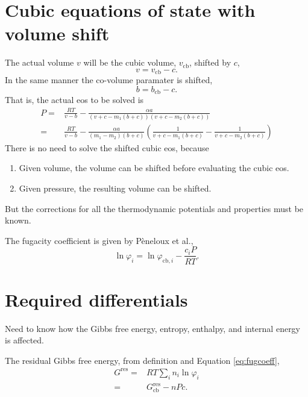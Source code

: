 \documentclass[english]{article}
\newcommand{\cubic}{\text{cb}}
\newcommand{\resid}{\text{res}}
\begin{document}
\section{Cubic equations of state with volume shift}
The actual volume $v$ will be the cubic volume, $v_\cubic$, shifted by $c$,
\begin{equation}
  v = v_\cubic - c.
\label{eq:actvolume}
\end{equation}
In the same manner the co-volume paramater is shifted,
\begin{equation}
  b = b_\cubic - c.
\label{eq:covolume}
\end{equation}
That is, the actual eos to be solved is
\begin{align}
  P =& \frac{RT}{v - b} -
  \frac{\alpha a}{(v + c - m_1 (b + c))(v + c - m_2 (b + c))}\\
  = & \frac{RT}{v -b} - \frac{\alpha a}{\left( m_1-m_2 \right)(b + c)}
  \left(\frac{1}{v + c - m_1 (b + c)} - \frac{1}{v + c - m_2 (b +
      c)}\right)
\label{eq:cubicshifted}
\end{align}
There is no need to solve the shifted cubic eos, because
\begin{enumerate}
\item Given volume, the volume can be shifted before evaluating the
  cubic eos.
\item Given pressure, the resulting volume can be shifted.
\end{enumerate}
But the corrections for all the thermodynamic potentials and
properties must be known.

The fugacity coefficient is given by Pèneloux et al.,
\begin{equation}
  \ln \varphi_i = \ln \varphi_{\cubic,i} - \frac{c_i P}{R T}.
\label{eq:fugcoeff}
\end{equation}

\section{Required differentials}
Need to know how the Gibbs free energy, entropy, enthalpy,  and
internal energy is affected.

The residual Gibbs free energy, from definition and Equation
\eqref{eq:fugcoeff},
\begin{align}
  G^\resid =& R T \underset{i}{\sum}n_i \ln \varphi_i\\
  =& G^\resid_\cubic - nPc.
\label{eq:G}
\end{align}
\end{document}
